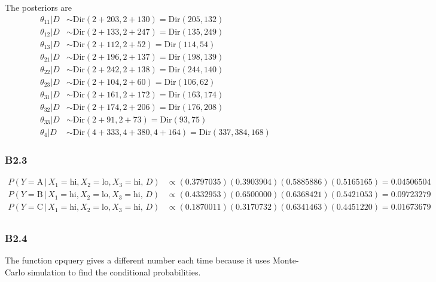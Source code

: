\documentclass{article}
\begin{document}
The posteriors are \begin{align*}
\theta_{11}|D &\sim \mathrm{Dir}(2{+}203, 2{+}130) = \mathrm{Dir}(205, 132) \\
\theta_{12}|D &\sim \mathrm{Dir}(2{+}133, 2{+}247) = \mathrm{Dir}(135, 249) \\
\theta_{13}|D &\sim \mathrm{Dir}(2{+}112, 2{+}52) = \mathrm{Dir}(114, 54) \\
\theta_{21}|D &\sim \mathrm{Dir}(2{+}196, 2{+}137) = \mathrm{Dir}(198, 139) \\
\theta_{22}|D &\sim \mathrm{Dir}(2{+}242, 2{+}138) = \mathrm{Dir}(244, 140) \\
\theta_{23}|D &\sim \mathrm{Dir}(2{+}104, 2{+}60) = \mathrm{Dir}(106, 62) \\
\theta_{31}|D &\sim \mathrm{Dir}(2{+}161, 2{+}172) = \mathrm{Dir}(163, 174) \\
\theta_{32}|D &\sim \mathrm{Dir}(2{+}174, 2{+}206) = \mathrm{Dir}(176, 208) \\
\theta_{33}|D &\sim \mathrm{Dir}(2{+}91, 2{+}73) = \mathrm{Dir}(93, 75) \\
\theta_4|D &\sim \mathrm{Dir}(4{+}333, 4{+}380, 4{+}164) = \mathrm{Dir}(337, 384, 168)
\end{align*}

\subsubsection*{B2.3}
\label{sec:B:B2:3}

\begin{align*}
    P(Y=\text{A} \,|\, X_1=\text{hi}, X_2=\text{lo}, X_3=\text{hi}, \,D) &\propto (0.3797035)(0.3903904)(0.5885886)(0.5165165) = 0.04506504 \\
    P(Y=\text{B} \,|\, X_1=\text{hi}, X_2=\text{lo}, X_3=\text{hi}, \,D) &\propto (0.4332953)(0.6500000)(0.6368421)(0.5421053) = 0.09723279 \\
    P(Y=\text{C} \,|\, X_1=\text{hi}, X_2=\text{lo}, X_3=\text{hi}, \,D) &\propto (0.1870011)(0.3170732)(0.6341463)(0.4451220) = 0.01673679 \\
\end{align*}

\subsubsection*{B2.4}
\label{sec:B:B2:4}

The function cpquery gives a different number each time because it uses Monte-Carlo simulation to find the conditional probabilities.
\end{document}
